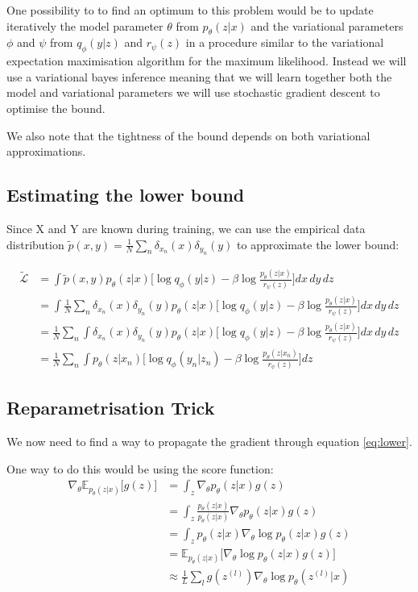 \documentclass[10pt,oneside,openright]{report}
\begin{document}
One possibility to to find an optimum to this problem would be to update iteratively the model parameter $\theta$ from $p_\theta(z|x)$  and the variational parameters $\phi$ and $\psi$ from $q_\phi(y|z)$ and $r_\psi(z)$ in a procedure similar to the variational expectation maximisation algorithm for the maximum likelihood. Instead we will use a variational bayes inference meaning that we will learn together both the model and variational parameters  we will use stochastic gradient descent to optimise the bound.

We also note that the tightness of the bound depends on both variational approximations.

\subsection{Estimating the lower bound}
Since X and Y are known during training, we can use the empirical data distribution $\tilde{p}(x, y) = \frac{1}{N}\sum_n\delta_{x_n}(x)\delta_{y_n}(y)$ to approximate the lower bound:

 \begin{align}
\tilde{\mathcal{L}} & = \int \tilde{p}(x, y) p_\theta(z|x) \Big[\log q_\phi(y|z) - \beta \log \frac{p_\theta(z|x)}{r_\psi(z)} \Big]dx\, dy\, dz  \\
   & = \int \frac{1}{N}\sum_n\delta_{x_n}(x)\delta_{y_n}(y) p_\theta(z|x) \Big[\log q_\phi(y|z) - \beta \log \frac{p_\theta(z|x)}{r_\psi(z)} \Big] dx\, dy\, dz \\
   & = \frac{1}{N}\sum_n \int \delta_{x_n}(x)\delta_{y_n}(y) p_\theta(z|x) \Big[ \log q_\phi(y|z) - \beta \log \frac{p_\theta(z|x)}{r_\psi(z)}\Big ] dx\, dy\, dz \\
   & = \frac{1}{N}\sum_n \int p_\theta(z|x_n) \Big[  \log q_\phi(y_n|z_n) - \beta   \log \frac{p_\theta(z|x_n)}{r_\psi(z)} \Big] dz \label{eq:lower}
\end{align}


\subsection{Reparametrisation Trick}
We now need to find a way to propagate the gradient through equation \ref{eq:lower}. 

One way to do this would be using the score function:
 \begin{align}
\nabla_\theta \mathbb{E}_{p_\theta(z|x)}\big[ g(z) \big] &= \int_z \nabla_\theta p_\theta(z|x)  g(z)\\
 &= \int_z \frac{p_\theta(z|x)}{p_\theta(z|x)} \nabla_\theta p_\theta(z|x)  g(z) \\
 &= \int_z p_\theta(z|x) \nabla_\theta \log p_\theta(z|x)  g(z)\\
&= \mathbb{E}_{p_\theta(z|x)}\big[ \nabla_\theta \log p_\theta(z|x) g(z)  \big]\\
&\approx \frac{1}{L} \sum_l  g(z^{(l)}) \nabla_\theta \log p_\theta(z^{(l)}|x)
\end{align}
\end{document}

